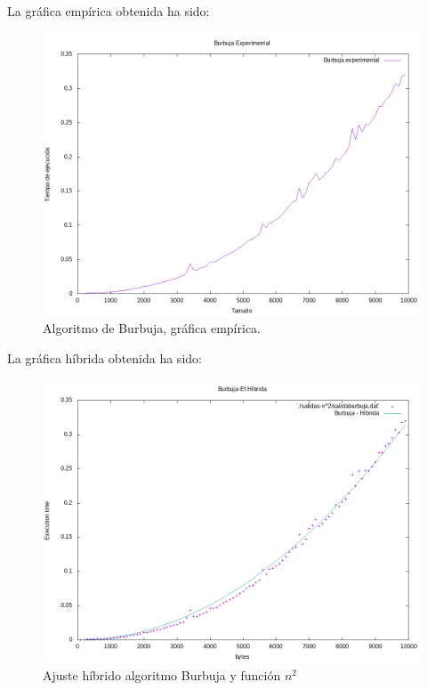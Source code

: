 La gráfica empírica obtenida ha sido:
\begin{figure}[H]
	\centering
	\includegraphics[scale=0.5]{imagenes/burbuja-experimental.png}
	\caption{Algoritmo de Burbuja, gráfica empírica.}
	\label{fig:E2}
\end{figure}





La gráfica híbrida obtenida ha sido:
\begin{figure}[H]
	\centering
	\includegraphics[scale=0.5]{imagenes/burbuja-hibrida.png}
	\caption{Ajuste híbrido algoritmo Burbuja y función $n^2$}
	\label{fig:E3}
\end{figure}	






